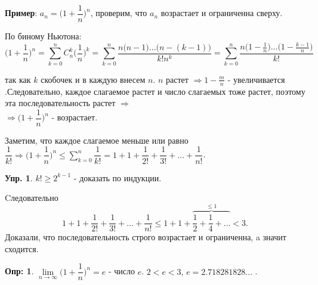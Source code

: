 \documentclass[12pt]{article}
\theoremstyle{definition}
\newtheorem{defn}{Опр:}
\newtheorem{exrc}{Упр.}
\begin{document}
\textbf{Пример}: $a_n = \bigg(1 + \dfrac{1}{n}\bigg)^n$, проверим, что $a_n$ возрастает и ограниченна сверху.

По биному Ньютона: $$\bigg(1 + \dfrac{1}{n}\bigg)^n = \sum\limits_{k = 0}^n C_n^k \bigg(\frac{1}{n}\bigg)^k = \sum\limits_{k = 0}^n \dfrac{n\big(n-1\big)...\big(n-(k-1)\big)}{k!n^k} = \sum\limits_{k = 0}^n \dfrac{n\big(1-\frac{1}{n}\big)...\big(1-\frac{k-1}{n}\big)}{k!	}$$

так как $k$ скобочек и в каждую внесем $n$. $n$ растет $\Rightarrow 1 -\frac{m}{n}$ - увеличивается .Следовательно, каждое слагаемое растет и число слагаемых тоже растет, поэтому эта последовательность растет $\Rightarrow$\\ 
$\Rightarrow \bigg(1 + \dfrac{1}{n}\bigg)^n$ - возрастает.

Заметим, что каждое слагаемое меньше или равно $\dfrac{1}{k!} \Rightarrow \bigg(1 + \dfrac{1}{n}\bigg)^n \leq \displaystyle \sum\limits_{k = 0}^n \dfrac{1}{k!} = 1 + 1 + \dfrac{1}{2!} + \dfrac{1}{3!} + \dotsc + \dfrac{1}{n!}$.

\begin{exrc}
	$k! \geq 2^{k-1}$ - доказать по индукции.
\end{exrc}
Cледовательно 
$$1 + 1 + \dfrac{1}{2!} + \dfrac{1}{3!} + \dotsc + \dfrac{1}{n!} \leq 1  + 1 + \overbrace{\dfrac{1}{2} + \dfrac{1}{4} + \dotsc}^{\leq 1} < 3.$$
Доказали, что последовательность строго возрастает и ограниченна, a значит сходится.

\begin{defn}
	$\lim\limits_{n \rightarrow \infty}\bigg(1 + \dfrac{1}{n}\bigg)^n = e$ - число $e$. $2 < e < 3, \, e = 2.718281828\dotsc$ .
\end{defn}
\end{document}

